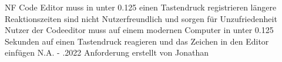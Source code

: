 \begin{myreq}
    \threeinline
    {\reqno }
    {\reqtype NF}
    {}
    \reqdesc Code Editor muss in unter 0.125 einen Tastendruck registrieren
    \reqrat längere Reaktionszeiten sind nicht Nutzerfreundlich und sorgen für Unzufriedenheit
    \reqorig Nutzer
    \reqfit der Codeeditor muss auf einem modernen Computer in unter 0.125 Sekunden auf einen Tastendruck reagieren und das Zeichen in den Editor einfügen
    \twoinline
    {}
    {}
    \twoinline
    {}
    {\reqconf N.A.}
    \reqmater -
    .2022 Anforderung erstellt von Jonathan
\end{myreq}